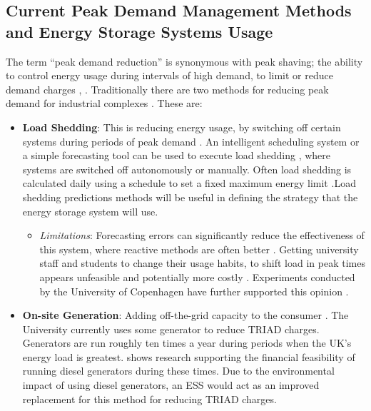 \subsection{Current Peak Demand Management Methods and Energy Storage
Systems
Usage}\label{current-peak-demand-management-methods-and-energy-storage-systems-usage}

The term ``peak demand reduction'' is synonymous with peak shaving; the
ability to control energy usage during intervals of high demand, to
limit or reduce demand charges \cite{schneiderRECPS}, \cite{baldorPS}.
Traditionally there are two methods for reducing peak demand for
industrial complexes \cite{schneiderRECPS}. These are:

\begin{itemize}
\tightlist
\item
  \textbf{Load Shedding}: This is reducing energy usage, by switching
  off certain systems during periods of peak demand \cite{6199851}. An
  intelligent scheduling system or a simple forecasting tool can be used
  to execute load shedding \cite{Reducing37:online}, where systems are
  switched off autonomously or manually. Often load shedding is
  calculated daily using a schedule to set a fixed maximum energy limit
  \cite{6938948}.Load shedding predictions methods will be useful in
  defining the strategy that the energy storage system will use.

  \begin{itemize}
  \tightlist
  \item
    \emph{Limitations}: Forecasting errors can significantly reduce the
    effectiveness of this system, where reactive methods are often
    better \cite{6938948}. Getting university staff and students to
    change their usage habits, to shift load in peak times appears
    unfeasible and potentially more costly \cite{Jbrentmeet}.
    Experiments conducted by the University of Copenhagen have further
    supported this opinion \cite{copenmeet}.
  \end{itemize}
\item
  \textbf{On-site Generation}: Adding off-the-grid capacity to the
  consumer \cite{schneiderRECPS}. The University currently uses some
  generator to reduce TRIAD charges. Generators are run roughly ten
  times a year during periods when the UK's energy load is greatest.
  \cite{shen2016} shows research supporting the financial feasibility of
  running diesel generators during these times. Due to the environmental
  impact of using diesel generators, an ESS would act as an improved
  replacement for this method for reducing TRIAD charges.


\end{itemize}
